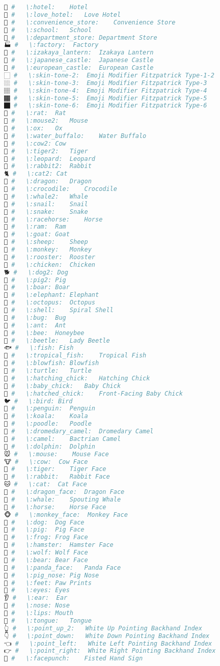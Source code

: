 \begin{lstlisting}[language=Julia, style=julia]
🏨 #   \:hotel:    Hotel
🏩 #   \:love_hotel:   Love Hotel
🏪 #   \:convenience_store:    Convenience Store
🏫 #   \:school:   School
🏬 #   \:department_store: Department Store
🏭 #   \:factory:  Factory
🏮 #   \:izakaya_lantern:  Izakaya Lantern
🏯 #   \:japanese_castle:  Japanese Castle
🏰 #   \:european_castle:  European Castle
🏻 #   \:skin-tone-2:  Emoji Modifier Fitzpatrick Type-1-2
🏼 #   \:skin-tone-3:  Emoji Modifier Fitzpatrick Type-3
🏽 #   \:skin-tone-4:  Emoji Modifier Fitzpatrick Type-4
🏾 #   \:skin-tone-5:  Emoji Modifier Fitzpatrick Type-5
🏿 #   \:skin-tone-6:  Emoji Modifier Fitzpatrick Type-6
🐀 #   \:rat:  Rat
🐁 #   \:mouse2:   Mouse
🐂 #   \:ox:   Ox
🐃 #   \:water_buffalo:    Water Buffalo
🐄 #   \:cow2: Cow
🐅 #   \:tiger2:   Tiger
🐆 #   \:leopard:  Leopard
🐇 #   \:rabbit2:  Rabbit
🐈 #   \:cat2: Cat
🐉 #   \:dragon:   Dragon
🐊 #   \:crocodile:    Crocodile
🐋 #   \:whale2:   Whale
🐌 #   \:snail:    Snail
🐍 #   \:snake:    Snake
🐎 #   \:racehorse:    Horse
🐏 #   \:ram:  Ram
🐐 #   \:goat: Goat
🐑 #   \:sheep:    Sheep
🐒 #   \:monkey:   Monkey
🐓 #   \:rooster:  Rooster
🐔 #   \:chicken:  Chicken
🐕 #   \:dog2: Dog
🐖 #   \:pig2: Pig
🐗 #   \:boar: Boar
🐘 #   \:elephant: Elephant
🐙 #   \:octopus:  Octopus
🐚 #   \:shell:    Spiral Shell
🐛 #   \:bug:  Bug
🐜 #   \:ant:  Ant
🐝 #   \:bee:  Honeybee
🐞 #   \:beetle:   Lady Beetle
🐟 #   \:fish: Fish
🐠 #   \:tropical_fish:    Tropical Fish
🐡 #   \:blowfish: Blowfish
🐢 #   \:turtle:   Turtle
🐣 #   \:hatching_chick:   Hatching Chick
🐤 #   \:baby_chick:   Baby Chick
🐥 #   \:hatched_chick:    Front-Facing Baby Chick
🐦 #   \:bird: Bird
🐧 #   \:penguin:  Penguin
🐨 #   \:koala:    Koala
🐩 #   \:poodle:   Poodle
🐪 #   \:dromedary_camel:  Dromedary Camel
🐫 #   \:camel:    Bactrian Camel
🐬 #   \:dolphin:  Dolphin
🐭 #   \:mouse:    Mouse Face
🐮 #   \:cow:  Cow Face
🐯 #   \:tiger:    Tiger Face
🐰 #   \:rabbit:   Rabbit Face
🐱 #   \:cat:  Cat Face
🐲 #   \:dragon_face:  Dragon Face
🐳 #   \:whale:    Spouting Whale
🐴 #   \:horse:    Horse Face
🐵 #   \:monkey_face:  Monkey Face
🐶 #   \:dog:  Dog Face
🐷 #   \:pig:  Pig Face
🐸 #   \:frog: Frog Face
🐹 #   \:hamster:  Hamster Face
🐺 #   \:wolf: Wolf Face
🐻 #   \:bear: Bear Face
🐼 #   \:panda_face:   Panda Face
🐽 #   \:pig_nose: Pig Nose
🐾 #   \:feet: Paw Prints
👀 #   \:eyes: Eyes
👂 #   \:ear:  Ear
👃 #   \:nose: Nose
👄 #   \:lips: Mouth
👅 #   \:tongue:   Tongue
👆 #   \:point_up_2:   White Up Pointing Backhand Index
👇 #   \:point_down:   White Down Pointing Backhand Index
👈 #   \:point_left:   White Left Pointing Backhand Index
👉 #   \:point_right:  White Right Pointing Backhand Index
👊 #   \:facepunch:    Fisted Hand Sign

\end{lstlisting}
